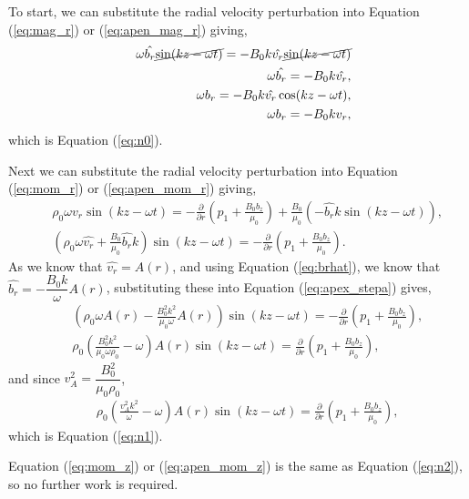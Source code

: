 To start, we can substitute the radial velocity perturbation into Equation (\ref{eq:mag_r}) or (\ref{eq:apen_mag_r}) giving,
\begin{align}
	&&\omega \hat{b_r} \cancel{\sin(kz-\omega t)} = -B_0k\hat{v_r} \cancel{\sin(kz-\omega t)}\\
	&&\omega \hat{b_r}= -B_0k\hat{v_r},\label{eq:brhat}\\
	&&\omega b_r=-B_0k\hat{v_r}\cos(kz-\omega t),\\
	&&\omega b_r=-B_0k{v_r},
\end{align}
which is Equation (\ref{eq:n0}).

Next we can substitute the radial velocity perturbation into Equation (\ref{eq:mom_r}) or (\ref{eq:apen_mom_r}) giving,
\begin{align}
    &&\rho_0 \omega \hat{v_r} \sin(kz-\omega t) =-\frac{\partial}{\partial r}
    \left(p_1+\frac{B_0b_z}{\mu_0}\right)+\frac{B_0}{\mu_0}\left(-\hat{b_r}k\sin(kz-\omega t)\right),\\
    &&\left(\rho_0 \omega \hat{v_r} + \frac{B_0}{\mu_0}\hat{b_r}k \right)\sin(kz-\omega t) =-\frac{\partial}{\partial r}\left(p_1+\frac{B_0b_z}{\mu_0}\right).\label{eq:apex_stepa}
\end{align}
As we know that $\hat{v_r} = A(r)$, and using Equation (\ref{eq:brhat}), we know that $\hat{b_r} = -\dfrac{B_0 k}{\omega}A(r)$, substituting these into Equation (\ref{eq:apex_stepa}) gives,
\begin{align}
&&\left(\rho_0 \omega A(r) - \frac{B_0^2 k^2}{\mu_0 \omega}A(r) \right)\sin(kz-\omega t) =-\frac{\partial}{\partial r}\left(p_1+\frac{B_0b_z}{\mu_0}\right),\\
&&\rho_0 \left(\frac{B_0^2 k^2}{\mu_0 \omega \rho_0} - \omega \right)A(r)\sin(kz-\omega t) =\frac{\partial}{\partial r}\left(p_1+\frac{B_0b_z}{\mu_0}\right),
\end{align}
and since $v_A^2 = \dfrac{B_0^2}{\mu_0\rho_0}$,
\begin{align}
&&\rho_0 \left(\frac{v_A^2 k^2}{\omega} - \omega \right)A(r)\sin(kz-\omega t) =\frac{\partial}{\partial r}\left(p_1+\frac{B_0b_z}{\mu_0}\right),
\end{align}
which is Equation (\ref{eq:n1}).

Equation (\ref{eq:mom_z}) or (\ref{eq:apen_mom_z}) is the same as Equation (\ref{eq:n2}), so no further work is required.

